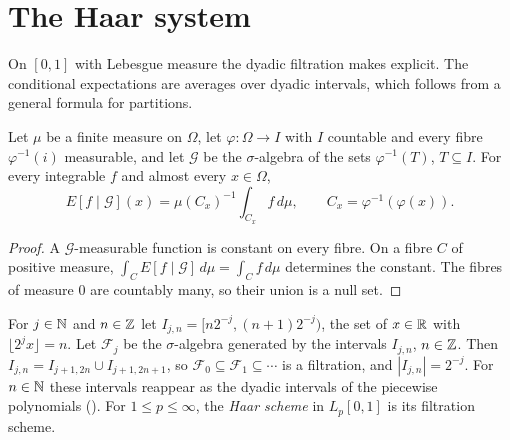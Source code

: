 \section{The Haar system}
\label{sec:haar}

On $[0, 1]$ with Lebesgue measure the dyadic filtration makes  explicit.
The conditional expectations are averages over dyadic intervals, which follows from a general
formula for partitions.

\begin{lemma}
\label{lem:condexp-partition}
\leanok
Let $\mu$ be a finite measure on $\Omega$, let $\varphi : \Omega \to I$ with $I$ countable and
every fibre $\varphi^{-1}(i)$ measurable, and let $\mathcal{G}$ be the $\sigma$-algebra of
the sets $\varphi^{-1}(T)$, $T \subseteq I$. For every integrable $f$ and almost every
$x \in \Omega$,
\[
  E[f \mid \mathcal{G}](x) = \mu(C_x)^{-1} \int_{C_x} f \, d\mu ,
  \qquad C_x = \varphi^{-1}(\varphi(x)) .
\]
\end{lemma}

\begin{proof}
\leanok
A $\mathcal{G}$-measurable function is constant on every fibre. On a fibre $C$ of positive
measure, $\int_C E[f \mid \mathcal{G}] \, d\mu = \int_C f \, d\mu$ determines the constant.
The fibres of measure $0$ are countably many, so their union is a null set.
\end{proof}

\begin{definition}
\label{def:dyadic-filtration}
\leanok
{}
For $j \in \mathbb{N}$ and $n \in \mathbb{Z}$ let $I_{j,n} = [n 2^{-j}, (n + 1) 2^{-j})$, the set of $x \in \mathbb{R}$
with $\lfloor 2^j x \rfloor = n$. Let $\mathcal{F}_j$ be the $\sigma$-algebra generated by the
intervals $I_{j,n}$, $n \in \mathbb{Z}$. Then $I_{j,n} = I_{j+1,2n} \cup I_{j+1,2n+1}$, so
$\mathcal{F}_0 \subseteq \mathcal{F}_1 \subseteq \cdots$ is a filtration, and
$|I_{j,n}| = 2^{-j}$. For $n \in \mathbb{N}$ these intervals reappear as the dyadic intervals of the
piecewise polynomials (). For $1 \leq p \leq \infty$, the \emph{Haar scheme}
in $L_p[0, 1]$ is its filtration scheme.
\end{definition}


